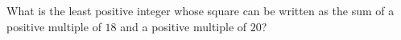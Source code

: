 What is the least positive integer whose square can be written as the sum of a positive multiple of $18$ and a positive multiple of $20$?
